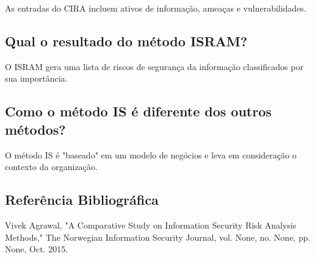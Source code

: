 \documentclass[a4paper,12pt]{report}
\begin{document}
As entradas do CIRA incluem ativos de informação, ameaças e vulnerabilidades.

\subsection{Qual o resultado do método ISRAM?}

O ISRAM gera uma lista de riscos de segurança da informação classificados por sua importância.

\subsection{Como o método IS é diferente dos outros métodos?}

O método IS é "baseado" em um modelo de negócios e leva em consideração o contexto da organização.

\subsection*{Referência Bibliográfica}

Vivek Agrawal, "A Comparative Study on Information Security Risk Analysis Methods," The Norwegian Information Security Journal, vol. None, no. None, pp. None, Oct. 2015.

\end{document}
